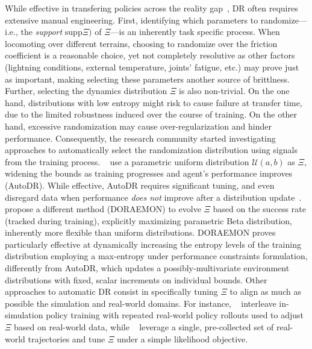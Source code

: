 While effective in transfering policies across the reality gap~\citep{jiDribbleBotDynamicLegged2023,tiboniDomainRandomizationEntropy2024}, DR often requires extensive manual engineering.
First, identifying which parameters to randomize---i.e., the \emph{support} \( \text{supp} \Xi) \) of \( \Xi \)---is an inherently task specific process.
When locomoting over different terrains, choosing to randomize over the friction coefficient is a reasonable choice, yet not completely resolutive as other factors (lightning conditions, external temperature, joints' fatigue, etc.) may prove just as important, making selecting these parameters another source of brittlness.
Further, selecting the dynamics distribution \( \Xi \) is also non-trivial.
On the one hand, distributions with low entropy might risk to cause failure at transfer time, due to the limited robustness induced over the course of training.
On the other hand, excessive randomization may cause over-regularization and hinder performance.
Consequently, the research community started investigating approaches to automatically select the randomization distribution using signals from the training process.
~\citet{akkayaSolvingRubiksCube2019} use a parametric uniform distribution \( \mathcal U(a, b) \) as \( \Xi \), widening the bounds as training progresses and agent's performance improves (AutoDR). 
While effective, AutoDR requires significant tuning, and even disregard data when performance \emph{does not} improve after a distribution update~\citep{tiboniDomainRandomizationEntropy2024}.
~\citet{tiboniDomainRandomizationEntropy2024} propose a different method (DORAEMON) to evolve \( \Xi \) based on the success rate (tracked during training), explicitly maximizing parametric Beta distribution, inherently more flexible than uniform distributions.
DORAEMON proves particularly effective at dynamically increasing the entropy levels of the training distribution employing a max-entropy under performance constraints formulation, differently from AutoDR, which updates a possibly-multivariate environment distributions with fixed, scalar increments on individual bounds.
Other approaches to automatic DR consist in specifically tuning \( \Xi \) to align as much as possible the simulation and real-world domains.
For instance, ~\citet{chebotar2019closing} interleave in-simulation policy training with repeated real-world policy rollouts used to adjust \( \Xi \) based on real-world data, while ~\citet{tiboniDROPOSimtoRealTransfer2023} leverage a single, pre-collected set of real-world trajectories and tune \( \Xi \) under a simple likelihood objective.

